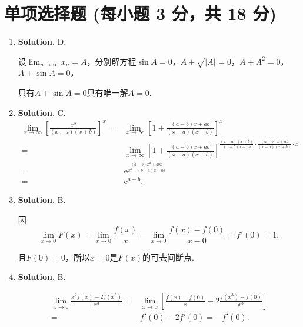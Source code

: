 \documentclass[../Main.tex]{subfiles}
\begin{document}
  \section{单项选择题 (每小题 3 分，共 18 分)}
  \begin{enumerate}
    \item \textbf{Solution}. D.

      设$\lim_{n\to\infty}x_{n}=A$，分别解方程$\sin A=0$，$A+\sqrt{|A|}=0$，$A+A^{2}
      =0$，$A+\sin A=0$，

      只有$A+\sin A=0$具有唯一解$A=0$.

    \item \textbf{Solution}. C.
      \[
        \begin{aligned}
          \lim_{x\to\infty}\left[\frac{x^2}{(x-a)(x+b)}\right]^{x}= & \lim_{x\to\infty}\left[1+\frac{(a-b)x+ab}{(x-a)(x+b)}\right]^{x}                                                                    \\
          =                                                         & \lim_{x\to\infty}\left[1+\frac{(a-b)x+ab}{(x-a)(x+b)}\right]^{\frac{(x-a)(x+b)}{(a-b)x+ab}\cdot\frac{(a-b)x+ab}{(x-a)(x+b)}\cdot x} \\
          =                                                         & \mathrm{e}^{\frac{(a-b)x^2+abx}{x^2+(b-a)x-ab}}                                                                                     \\
          =                                                         & \mathrm{e}^{a-b}.
        \end{aligned}
      \]

    \item \textbf{Solution}. B.

      因
      \[
        \lim_{x\to0}F(x)=\lim_{x\to0}\frac{f(x)}{x}=\lim_{x\to0}\frac{f(x)-f(0)}{x-0}
        =f'(0)=1,
      \]

      且$F(0)=0$，所以$x=0$是$F(x)$的可去间断点.

    \item \textbf{Solution}. B.

      \[
        \begin{aligned}
          \lim_{x\to0}\frac{x^2f(x)-2f(x^3)}{x^3}= & \lim_{x\to0}\left[\frac{f(x)-f(0)}{x}-2\frac{f(x^3)-f(0)}{x^3}\right] \\
          =                                        & f'(0)-2f'(0)=-f'(0).
        \end{aligned}
      \]


\end{enumerate}
\end{document}
